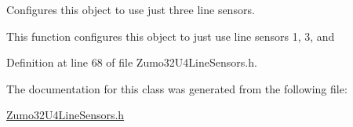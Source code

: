 Configures this object to use just three line sensors. 

This function configures this object to just use line sensors 1, 3, and
\begin{DoxyEnumerate}
\item 
\end{DoxyEnumerate}

Definition at line 68 of file Zumo32\+U4\+Line\+Sensors.\+h.



The documentation for this class was generated from the following file\+:\begin{DoxyCompactItemize}
\item 
\hyperlink{_zumo32_u4_line_sensors_8h}{Zumo32\+U4\+Line\+Sensors.\+h}\end{DoxyCompactItemize}
